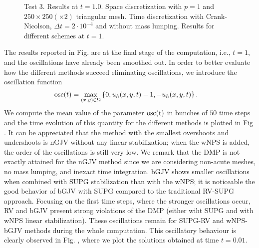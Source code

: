 \begin{figure}
\caption{ Test 3. Results at $t = 1.0$. Space discretization with $p=1$ and $250\times 250 (\times 2)$ triangular mesh. Time discretization with Crank-Nicolson, $\Delta t = 2 \cdot 10^{-4}$ and without mass lumping. Results for different schemes at $t = 1 $.}\label{fig-triangle1}
\end{figure}



The results reported in Fig.  are at the final stage of the computation, i.e., $t=1$, and the oscillations have already been smoothed out. In order to better evaluate how the different methods succeed eliminating oscillations, we introduce the oscillation function
\begin{align*}
&{\rm osc}(t) = \max_{(x,y)\in \Omega} \left\{0 , u_h(x,y,t) - 1 , -u_h(x,y,t) \right\}.
\end{align*}
We compute the mean value of the parameter ${\rm osc(t)}$ in bunches of $50$ time steps and the time evolution of this quantity for the different methods is plotted in Fig . It can be appreciated that the method with the smallest overshoots and undershoots is nGJV without any linear stabilization; when the wNPS is added, the order of the oscillations is still very low. We remark that the DMP is not exactly attained for the nGJV method since we are considering non-acute meshes, no mass lumping, and inexact time integration. bGJV shows smaller oscillations when combined with SUPG stabilization than with the wNPS; it is noticeable the good behavior of bGJV with SUPG compared to the traditional RV-SUPG approach. Focusing on the first time steps, where the stronger oscillations occur, RV and bGJV present strong violations of the DMP (either wiht SUPG and with wNPS linear stabilization). These oscillations remain for SUPG-RV and wNPS-bGJV methods during the whole computation. This oscillatory behaviour is clearly observed  in Fig. , where we plot the solutions obtained  at time $t=0.01$. 

